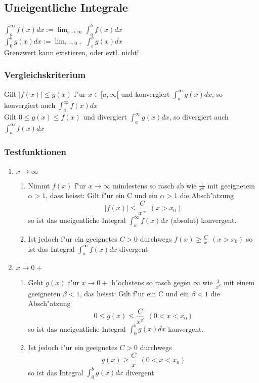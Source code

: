 \documentclass[10pt, a4paper, twocolumn]{scrartcl}
\begin{document}
\subsection{Uneigentliche Integrale}

$\int^{\infty}_a f(x)dx:=\lim_{b\rightarrow \infty}\int^b_a f(x)dx$\\
$\int^{b}_0 g(x)dx:=\lim_{\epsilon\to 0+}\int^b_\epsilon g(x)dx$\\
Grenzwert kann existieren, oder evtl. nicht!

\subsubsection{Vergleichskriterium}

Gilt $|f(x)|\leq g(x)$ f"ur $x \in [a,\infty[$ und konvergiert $\int^{\infty}_a g(x)dx$, so konvergiert auch $\int^{\infty}_a f(x)dx$\\
Gilt $0\leq g(x) \leq f(x)$ und divergiert $\int^{\infty}_a g(x)dx$, so divergiert auch $\int^{\infty}_a f(x)dx$

\subsubsection{Testfunktionen}

\begin{enumerate}
\item $\mathit{x\to\infty}$
\begin{enumerate}
 \item Nimmt $f(x)$ f"ur $x\to\infty$ mindestens so rasch ab wie $\frac{1}{x^\alpha}$ mit geeignetem $\alpha > 1$, dass heisst: Gilt f"ur ein C und ein $\alpha > 1$ die Absch"atzung
  $$|f(x)|\leq\frac{C}{x^\alpha}\:\:(x>x_0)$$
  so ist das uneigentliche Integral $\int^\infty_{a}f(x)dx$ (absolut) konvergent.
 \item Ist jedoch f"ur ein geeignetes $C>0$ durchwegs
  $f(x)\geq\frac{C}{x}\:\:(x>x_0)$
  so ist das Integral $\int^\infty_a f(x) dx$ divergent
\end{enumerate}
\item $\mathit{x\to0+}$
\begin{enumerate}
 \item Geht $g(x)$ f"ur $x\to 0+$ h"ochstens so rasch gegen $\infty$ wie $\frac{1}{x^\beta}$ mit einem geeigneten $\beta < 1$, das heisst: Gilt f"ur ein C und ein $\beta < 1$ die Absch"atzung
  $$0\leq g(x)\leq \frac{C}{x^\beta}\:\:(0<x<x_0)$$
  so ist das uneigentliche Integral $\int^b_0 g(x)dx$ konvergent.
 \item Ist jedoch f"ur ein geeignetes $C>0$ durchwegs
  $$g(x)\geq\frac{C}{x}\:\:(0<x<x_0)$$
  so ist das Integral $\int^b_0g(x)dx$ divergent
\end{enumerate}
\end{enumerate}
\end{document}
